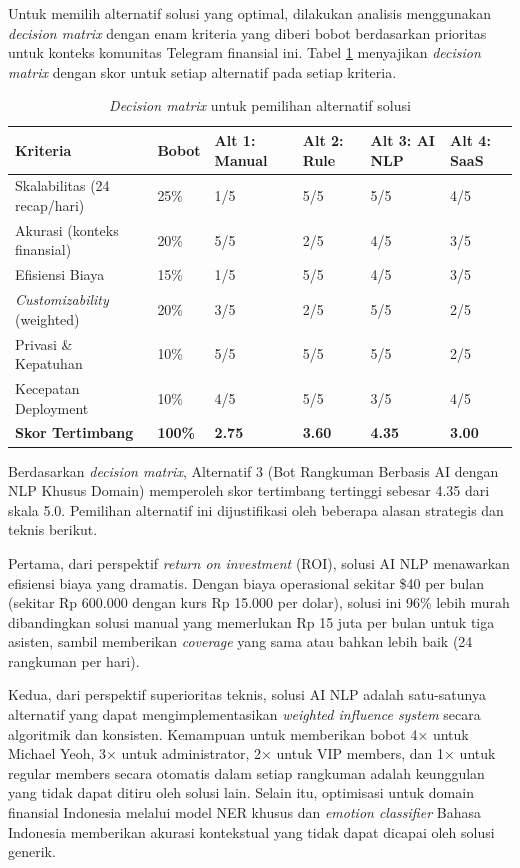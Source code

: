 Untuk memilih alternatif solusi yang optimal, dilakukan analisis menggunakan \textit{decision matrix} dengan enam kriteria yang diberi bobot berdasarkan prioritas untuk konteks komunitas Telegram finansial ini. Tabel \ref{tab:decision-matrix} menyajikan \textit{decision matrix} dengan skor untuk setiap alternatif pada setiap kriteria.

\begin{table}[H]
\centering
\caption{\textit{Decision matrix} untuk pemilihan alternatif solusi}
\label{tab:decision-matrix}
\begin{tabular}{|p{3.5cm}|p{1.3cm}|p{1.3cm}|p{1.3cm}|p{1.3cm}|p{1.3cm}|}
\hline
\textbf{Kriteria} & \textbf{Bobot} & \textbf{Alt 1: Manual} & \textbf{Alt 2: Rule} & \textbf{Alt 3: AI NLP} & \textbf{Alt 4: SaaS} \\
\hline
Skalabilitas (24 recap/hari) & 25\% & 1/5 & 5/5 & 5/5 & 4/5 \\
\hline
Akurasi (konteks finansial) & 20\% & 5/5 & 2/5 & 4/5 & 3/5 \\
\hline
Efisiensi Biaya & 15\% & 1/5 & 5/5 & 4/5 & 3/5 \\
\hline
\textit{Customizability} (weighted) & 20\% & 3/5 & 2/5 & 5/5 & 2/5 \\
\hline
Privasi \& Kepatuhan & 10\% & 5/5 & 5/5 & 5/5 & 2/5 \\
\hline
Kecepatan Deployment & 10\% & 4/5 & 5/5 & 3/5 & 4/5 \\
\hline
\textbf{Skor Tertimbang} & \textbf{100\%} & \textbf{2.75} & \textbf{3.60} & \textbf{4.35} & \textbf{3.00} \\
\hline
\end{tabular}
\end{table}

Berdasarkan \textit{decision matrix}, Alternatif 3 (Bot Rangkuman Berbasis AI dengan NLP Khusus Domain) memperoleh skor tertimbang tertinggi sebesar 4.35 dari skala 5.0. Pemilihan alternatif ini dijustifikasi oleh beberapa alasan strategis dan teknis berikut.

Pertama, dari perspektif \textit{return on investment} (ROI), solusi AI NLP menawarkan efisiensi biaya yang dramatis. Dengan biaya operasional sekitar \$40 per bulan (sekitar Rp 600.000 dengan kurs Rp 15.000 per dolar), solusi ini 96\% lebih murah dibandingkan solusi manual yang memerlukan Rp 15 juta per bulan untuk tiga asisten, sambil memberikan \textit{coverage} yang sama atau bahkan lebih baik (24 rangkuman per hari).

Kedua, dari perspektif superioritas teknis, solusi AI NLP adalah satu-satunya alternatif yang dapat mengimplementasikan \textit{weighted influence system} secara algoritmik dan konsisten. Kemampuan untuk memberikan bobot 4× untuk Michael Yeoh, 3× untuk administrator, 2× untuk VIP members, dan 1× untuk regular members secara otomatis dalam setiap rangkuman adalah keunggulan yang tidak dapat ditiru oleh solusi lain. Selain itu, optimisasi untuk domain finansial Indonesia melalui model NER khusus dan \textit{emotion classifier} Bahasa Indonesia memberikan akurasi kontekstual yang tidak dapat dicapai oleh solusi generik.

